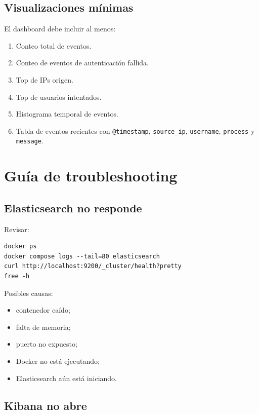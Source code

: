\documentclass[
  coursetitle={Cómputo Nube y Tecnologías Emergentes},
  coursehours={96},
  coursedate={Verano 2026},
  doctype={Práctica},
  otherlangs={english,french},
  authorname={Lázaro},
  authorsurname={Bustio-Martínez},
  authortitle={PhD},
  role={Profesor Investigador},
  email={lbustio@inaoe.mx},
  phone={5559504000},
  ext={7459},
  institution={Instituto Nacional de Astrofísica, Óptica y Electrónica (INAOE)},
  department={Maestría en Ciencias en Tecnologías de Seguridad},
  address={Luis Enrique Erro 1, Sta. Ma. Tonantzintla, San Andrés Cholula, CP 72840, Puebla, México},
  margin={0.5in}
]{../../lbustio_lecture_notes}
\begin{document}
\subsection{Visualizaciones mínimas}

El dashboard debe incluir al menos:

\begin{enumerate}
    \item Conteo total de eventos.
    \item Conteo de eventos de autenticación fallida.
    \item Top de IPs origen.
    \item Top de usuarios intentados.
    \item Histograma temporal de eventos.
    \item Tabla de eventos recientes con \texttt{@timestamp}, \texttt{source\_ip}, \texttt{username}, \texttt{process} y \texttt{message}.
\end{enumerate}

\section{Guía de troubleshooting}

\subsection{Elasticsearch no responde}

Revisar:

\begin{lstlisting}
docker ps
docker compose logs --tail=80 elasticsearch
curl http://localhost:9200/_cluster/health?pretty
free -h
\end{lstlisting}

Posibles causas:

\begin{itemize}
    \item contenedor caído;
    \item falta de memoria;
    \item puerto no expuesto;
    \item Docker no está ejecutando;
    \item Elasticsearch aún está iniciando.
\end{itemize}

\subsection{Kibana no abre}
\end{document}
